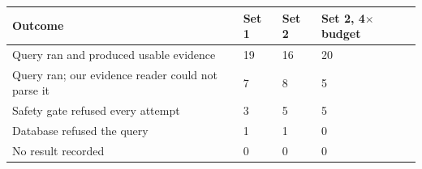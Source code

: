 \begin{tabular}{@{}L{0.48\textwidth}R{0.13\textwidth}R{0.13\textwidth}R{0.16\textwidth}@{}}
\toprule
Outcome & Set 1 & Set 2 & Set 2, 4$\times$ budget \\
\midrule
Query ran and produced usable evidence & 19 & 16 & 20 \\
Query ran; our evidence reader could not parse it & 7 & 8 & 5 \\
Safety gate refused every attempt & 3 & 5 & 5 \\
Database refused the query & 1 & 1 & 0 \\
No result recorded & 0 & 0 & 0 \\
\bottomrule
\end{tabular}
